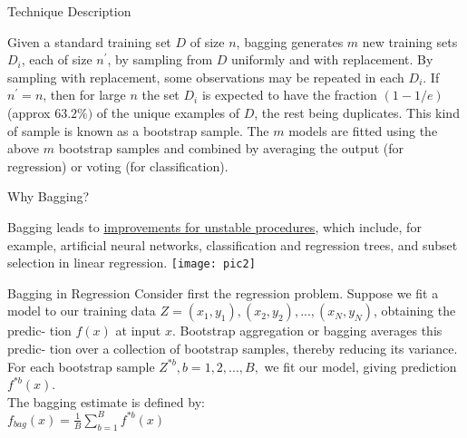 \documentclass[13pt]{beamer}
\begin{document}
\begin{frame}{Technique Description}
\begin{block}

Given a standard training set $D$ of size $n$, bagging generates $m$ new training sets $D_i$, each of size $n^{'}$, by sampling from $D$ uniformly and with replacement. By sampling with replacement, some observations may be repeated in each $D_i$. If $n^{'}=n$, then for large $n$ the set $D_i$ is expected to have the fraction $(1 - 1/e)$ (approx $63.2\%)$ of the unique examples of $D$, the rest being duplicates. This kind of sample is known as a bootstrap sample. The $m$ models are fitted using the above $m$ bootstrap samples and combined by averaging the output (for regression) or voting (for classification). 
\end{block}

\end{frame}


\begin{frame}{Why Bagging?}
\begin{block}

Bagging leads to \underline{improvements for unstable procedures}, which include, for example, artificial neural networks, classification and regression trees, and subset selection in linear regression. \vspace{16pt}
\texttt{[image: pic2]}
\end{block}

\end{frame}

\begin{frame}{Bagging in Regression}
Consider first the regression problem. Suppose we fit a model to our
training data $Z = {(x_1 , y_1 ), (x_2 , y_2 ), . . . , (x_N , y_N )}$, obtaining the predic-
tion $f(x)$ at input $x$. Bootstrap aggregation or bagging averages this predic-
tion over a collection of bootstrap samples, thereby reducing its variance.
For each bootstrap sample $Z^{*b} , b = 1, 2, . . . , B,$ we fit our model, giving
prediction $f^{*b}(x)$.
\\The bagging estimate is defined by:\\ \vspace{20pt}
\hspace*{30mm} \Large $f_{bag}(x) = \frac{1}{B}\sum_{b=1}^{B} f^{*b}(x)$
\end{frame}
\end{document}
